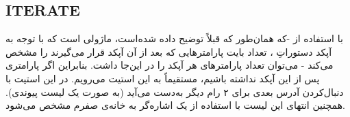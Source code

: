 \subsection*{ITERATE}
با استفاده از
-که همان‌طور که قبلاً توضیح داده شده‌است، ماژولی است که با توجه به آپکد دستوراتِ
،
  تعداد بایت پارامترهایی که بعد از آن آپکد قرار می‌گیرند را مشخص می‌کند - می‌توان تعداد پارامترهای هر آپکد را در این‌جا داشت. بنابراین اگر پارامتری پس از این آپکد نداشته باشیم، مستقیماً به این استیت می‌رویم.
  در این استیت با دنبال‌کردن 
آدرس بعدی برای ۲ رام دیگر به‌دست می‌آید (به صورت یک لیست پیوندی). همچنین انتهای این لیست با استفاده از یک اشاره‌گر به خانه‌ی صفرم مشخص می‌شود.
  
  
